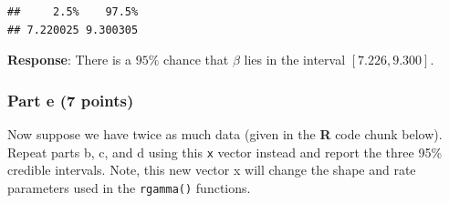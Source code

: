 \documentclass[
]{article}
\begin{document}
\begin{verbatim}
##     2.5%    97.5% 
## 7.220025 9.300305
\end{verbatim}

\textbf{Response}: There is a \(95\%\) chance that \(\beta\) lies in the
interval \([7.226, 9.300]\).

\hypertarget{part-e-7-points}{%
\subsubsection{Part e (7 points)}\label{part-e-7-points}}

Now suppose we have twice as much data (given in the \textbf{R} code
chunk below). Repeat parts b, c, and d using this \texttt{x} vector
instead and report the three 95\% credible intervals. Note, this new
vector x will change the shape and rate parameters used in the
\texttt{rgamma()} functions.
\end{document}
